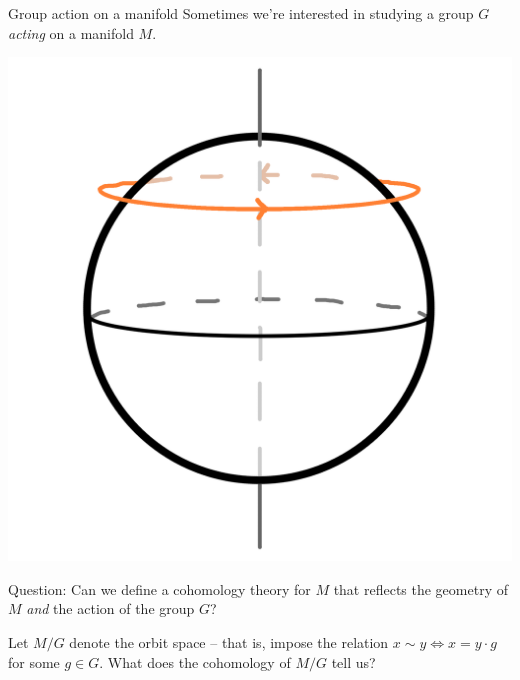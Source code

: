 \documentclass{beamer}
\begin{document}
\begin{frame}{Group action on a manifold}
Sometimes we're interested in studying a group $G$ \emph{acting} on a manifold $M$.
\begin{center}
\includegraphics[scale=0.04]{"Group action sphere"}
\end{center}
\begin{block}{Question:}
Can we define a cohomology theory for $M$ that reflects the geometry of $M$ \emph{and} the action of the group $G$?
\end{block}
Let $M/G$ denote the orbit space -- that is, impose the relation $x \sim y \iff x= y \cdot g$ for some $g\in G$. What does the cohomology of $M/G$ tell us?
\end{frame}
\end{document}
